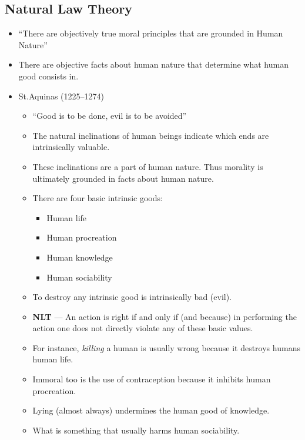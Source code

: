 \documentclass{article}
\begin{document}
\begin{spacing}{1.2}
    \newpage
    \section{Natural Law Theory}
    \begin{itemize}
        \item ``There are objectively true moral principles that are grounded in Human Nature''
        \item There are objective facts about human nature that determine what human good consists in.
        \item St.\@Thomas Aquinas (1225--1274)
              \begin{itemize}
                  \item ``Good is to be done, evil is to be avoided''
                  \item The natural inclinations of human beings indicate which ends are intrinsically valuable.
                  \item These inclinations are a part of human nature. Thus morality is ultimately grounded in facts about human nature.
                  \item There are four basic intrinsic goods:
                        \begin{itemize}
                            \item Human life
                            \item Human procreation
                            \item Human knowledge
                            \item Human sociability
                        \end{itemize}
                  \item To destroy any intrinsic good is intrinsically bad (evil).
                  \item \textbf{NLT} --- An action is right if and only if (and because) in performing the action one does not directly violate any of these basic values.
                  \item For instance, \emph{killing} a human is usually wrong because it destroys humans human life.
                  \item Immoral too is the use of contraception because it inhibits human procreation.
                  \item Lying (almost always) undermines the human good of knowledge.
                  \item What is something that usually harms human sociability.

\end{itemize}
\end{itemize}
\end{spacing}
\end{document}
